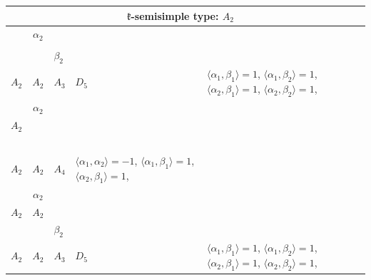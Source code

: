 \documentclass[12pt]{report}
\begin{document}
\begin{appendix}
{\begin{longtable}{rcl p{1cm}p{1cm}p{3cm} }
\\
\hline\multicolumn{5}{c}{$\mathfrak{k}$-semisimple type: $A_2$}\\
\hline\hline\begin{tabular}{cc}$\alpha_1$+ & $\alpha_2$\\\tiny{  } & \tiny{  }\end{tabular} &\begin{tabular}{c} = \\~ \end{tabular} & \begin{tabular}{cc}$\beta_1$+ & $\beta_2$\\\tiny{ $A_2$ } & \tiny{ $A_2$ }\end{tabular} & $A_3$ & $D_5$ &  $\langle\alpha_1, \beta_1\rangle=1$, $\langle\alpha_1, \beta_2\rangle=1$, $\langle\alpha_2, \beta_1\rangle=1$, $\langle\alpha_2, \beta_2\rangle=1$, 
\\
\begin{tabular}{cc}$\alpha_1$+ & $\alpha_2$\\\tiny{ $A_2$ } & \tiny{  }\end{tabular} &\begin{tabular}{c} = \\~ \end{tabular} & \begin{tabular}{c}$\beta_1$\\\tiny{ $A_2$ }\end{tabular} & $A_2$ & $A_4$ & $\langle\alpha_1, \alpha_2\rangle=-1$,  $\langle\alpha_1, \beta_1\rangle=1$, $\langle\alpha_2, \beta_1\rangle=1$, 
\\
\begin{tabular}{cc}$\alpha_1$+ & $\alpha_2$\\\tiny{ $A_2$ } & \tiny{ $A_2$ }\end{tabular} &\begin{tabular}{c} = \\~ \end{tabular} & \begin{tabular}{cc}$\beta_1$+ & $\beta_2$\\\tiny{ $A_2$ } & \tiny{ $A_2$ }\end{tabular} & $A_3$ & $D_5$ &  $\langle\alpha_1, \beta_1\rangle=1$, $\langle\alpha_1, \beta_2\rangle=1$, $\langle\alpha_2, \beta_1\rangle=1$, $\langle\alpha_2, \beta_2\rangle=1$, 
\\

\end{longtable}}
\end{appendix}
\end{document}
